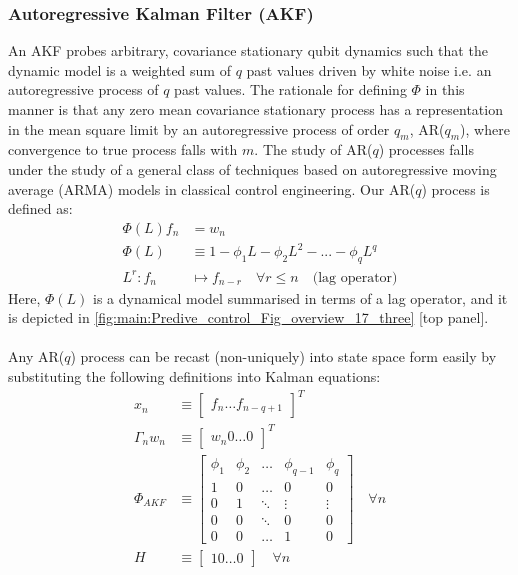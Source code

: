 \subsubsection{Autoregressive Kalman Filter (AKF)}
An AKF probes arbitrary, covariance stationary qubit dynamics such that the dynamic model is a weighted sum of $q$ past values driven by white noise i.e. an autoregressive process of $q$ past values. The rationale for defining $\Phi$ in this manner is that any zero mean covariance stationary process has a representation in the mean square limit by an autoregressive process of order $q_m$, AR($q_m$), where convergence to true process falls with $m$. The study of AR($q$) processes falls under the study of a general class of techniques based on autoregressive moving average (ARMA) models in classical control engineering. Our AR($q$) process is defined as:
\begin{align}
\Phi(L) f_n & = w_n \\
\Phi(L) & \equiv  1 - \phi_1 L - \phi_2 L^2 - ... - \phi_q L^q \\
L^r: f_n &\mapsto f_{n-r} \quad \forall r \leq n \quad \text{(lag operator)} 
\end{align}
Here, $\Phi(L)$ is a dynamical model summarised in terms of a lag operator, and it is depicted in \cref{fig:main:Predive_control_Fig_overview_17_three} [top panel].
\\
\\
Any AR($q$) process can be recast (non-uniquely) into state space form easily by substituting the following definitions into Kalman equations:
\begin{align}
x_n & \equiv  \begin{bmatrix} f_{n} \hdots f_{n-q+1} \end{bmatrix}^T \\
\Gamma_n w_n & \equiv \begin{bmatrix} w_{n} 0 \hdots 0 \end{bmatrix}^T \\
\Phi_{AKF} & \equiv 
\begin{bmatrix}
\phi_1 & \phi_2 & \hdots & \phi_{q-1} & \phi_q \\ 
1 & 0 & \hdots & 0 & 0 \\  
0 & 1 & \ddots & \vdots & \vdots \\ 
0 & 0 & \ddots & 0 & 0 \\ 
0 & 0 & \hdots & 1 & 0 
\end{bmatrix} \quad \forall n \label{eqn:akf_Phi} \\
H & \equiv \begin{bmatrix} 1 0 \hdots 0 \end{bmatrix} \quad \forall n 
\end{align}
